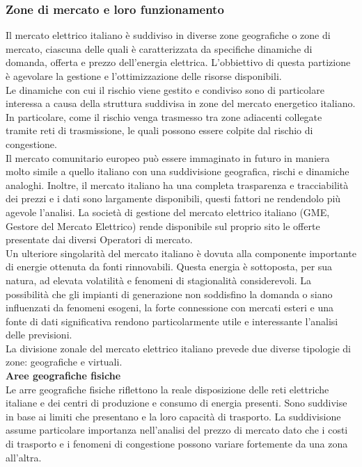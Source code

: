 \documentclass{article}
\begin{document}
\subsubsection{Zone di mercato e loro funzionamento}
Il mercato elettrico italiano è suddiviso in diverse zone geografiche o zone di mercato, ciascuna delle quali è caratterizzata da specifiche dinamiche di domanda, offerta e prezzo dell'energia elettrica. L’obbiettivo di questa partizione è agevolare la gestione e l’ottimizzazione delle risorse disponibili.\\
Le dinamiche con cui il rischio viene gestito e condiviso sono di particolare interessa a causa della struttura suddivisa in zone del mercato energetico italiano. In particolare, come il rischio venga trasmesso tra zone adiacenti collegate tramite reti di trasmissione, le quali possono essere colpite dal rischio di congestione. \\
Il mercato comunitario europeo può essere immaginato in futuro in maniera molto simile a quello italiano con una suddivisione geografica, rischi e dinamiche analoghi. Inoltre, il mercato italiano ha una completa trasparenza e tracciabilità dei prezzi e i dati sono largamente disponibili, questi fattori ne rendendolo più agevole l’analisi. La società di gestione del mercato elettrico italiano (GME, Gestore del Mercato Elettrico) rende disponibile sul proprio sito le offerte presentate dai diversi Operatori di mercato.\cite{GME_Sito}\\
Un ulteriore singolarità del mercato italiano è dovuta alla componente importante di energie ottenuta da fonti rinnovabili. Questa energia è sottoposta, per sua natura, ad elevata volatilità e fenomeni di stagionalità considerevoli. La possibilità che gli impianti di generazione non soddisfino la domanda o siano influenzati da fenomeni esogeni, la forte connessione con mercati esteri e una fonte di dati significativa rendono particolarmente utile e interessante l’analisi delle previsioni.\\
La divisione zonale del mercato elettrico italiano prevede due diverse tipologie di zone: geografiche e virtuali.\\
\textbf{Aree geografiche fisiche}\\
Le arre geografiche fisiche riflettono la reale disposizione delle reti elettriche italiane e dei centri di produzione e consumo di energia presenti. Sono suddivise in base ai limiti che presentano e la loro capacità di trasporto. La suddivisione assume particolare importanza nell’analisi del prezzo di mercato dato che i costi di trasporto e i fenomeni di congestione possono variare fortemente da una zona all’altra.\\
\end{document}
